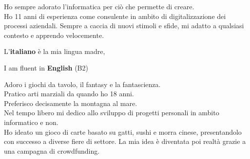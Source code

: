 
Ho sempre adorato l'informatica per ciò che permette di creare.\\ 
Ho 11 anni di esperienza come consulente in ambito di digitalizzazione dei processi aziendali.
Sempre a caccia di nuovi stimoli e sfide, mi adatto a qualsiasi contesto e apprendo velocemente.


L'\textbf{italiano} è la mia lingua madre,

I am fluent in \textbf{English} (B2)


Adoro i giochi da tavolo, il fantasy e la fantascienza.\\
Pratico arti marziali da quando ho 18 anni.\\
Preferisco decisamente la montagna al mare.\\
Nel tempo libero mi dedico allo sviluppo di progetti personali in ambito informatico e non.\\
Ho ideato un gioco di carte basato su gatti, sushi e morra cinese, presentandolo con successo a diverse fiere di settore. La mia idea è diventata poi realtà grazie a una campagna di crowdfunding.